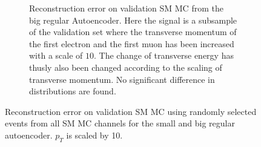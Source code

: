 \begin{figure}[h!]
\begin{subfigure}{.45\textwidth}
        \caption{Reconstruction error on validation SM MC from the big regular Autoencoder. Here the signal is a subsample of the validation 
        set where the transverse momentum of the first electron and the first muon has been increased with a scale of $10$. The change of transverse 
        energy has thusly also been changed according to the scaling of transverse momentum. No significant difference in distributions are found. }
        \label{fig:ae_big_pt_10}
    \end{subfigure}
    \hfill 
    \caption[AE | Reconstruction error $p_T$ altering of 10]{Reconstruction error on validation SM MC using randomly selected events from all SM MC channels for the small and big regular autoencoder. 
    $p_T$ is scaled by 10. }
    \label{fig:ae_big_small_pt_10}
\end{figure}



